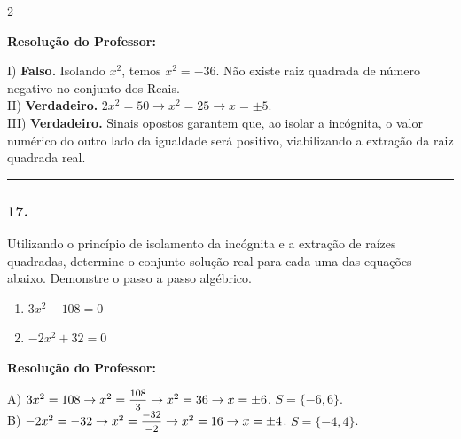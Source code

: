 \begin{multicols*}{2}
\ifgabarito
    \begin{tcolorbox}[colback=CorTitUm!5, colframe=CorTitUm, boxrule=1pt, arc=4pt, left=6pt, right=6pt, top=6pt, bottom=6pt]
    \small\textbf{\textcolor{CorTitUm}{Resolução do Professor:}}\par\vspace{0.1cm}
    \color{CinzaEscuro}
    I) \textbf{Falso.} Isolando $x^2$, temos $x^2 = -36$. Não existe raiz quadrada de número negativo no conjunto dos Reais.\\
    II) \textbf{Verdadeiro.} $2x^2 = 50 \rightarrow x^2 = 25 \rightarrow x = \pm 5$.\\
    III) \textbf{Verdadeiro.} Sinais opostos garantem que, ao isolar a incógnita, o valor numérico do outro lado da igualdade será positivo, viabilizando a extração da raiz quadrada real.
    \end{tcolorbox}
\fi

\par\vspace{\espacoQuestao}

\noindent\textcolor{CorLinha}{\rule{\linewidth}{0.5pt}} 
\par\vspace{\espacoPreQuestao}
\subsubsection*{17.} Utilizando o princípio de isolamento da incógnita e a extração de raízes quadradas, determine o conjunto solução real para cada uma das equações abaixo. Demonstre o passo a passo algébrico.
\begin{enumerate}[label=\Alph*), itemsep=\espacoAlt]
    \item $ 3x^2 - 108 = 0 $
    \item $ -2x^2 + 32 = 0 $
\end{enumerate}

\ifgabarito
    \begin{tcolorbox}[colback=CorTitUm!5, colframe=CorTitUm, boxrule=1pt, arc=4pt, left=6pt, right=6pt, top=6pt, bottom=6pt]
    \small\textbf{\textcolor{CorTitUm}{Resolução do Professor:}}\par\vspace{0.1cm}
    \color{CinzaEscuro}
    A) $3x^2 = 108 \rightarrow x^2 = \mfrac{108}{3} \rightarrow x^2 = 36 \rightarrow x = \pm 6$. $S = \{-6, 6\}$.\\
    B) $-2x^2 = -32 \rightarrow x^2 = \mfrac{-32}{-2} \rightarrow x^2 = 16 \rightarrow x = \pm 4$. $S = \{-4, 4\}$.
    \end{tcolorbox}
\fi


\end{multicols*}
